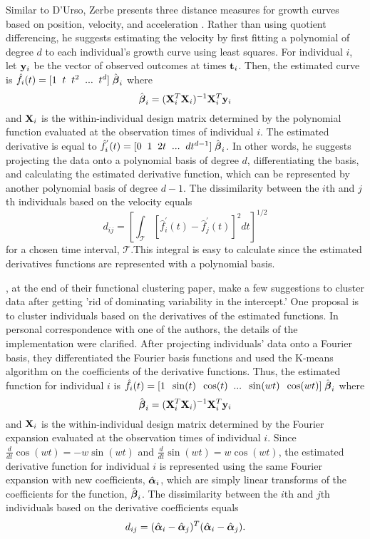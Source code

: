 Similar to D'Urso, Zerbe presents three distance measures for growth curves based on position, velocity, and acceleration \cite{zerbe1979,schneiderman1993}. Rather than using quotient differencing, he suggests estimating the velocity by first fitting a polynomial of degree $d$ to each individual's growth curve using least squares. For individual $i$, let $\mathbf y_{i}$ be the vector of observed outcomes at times $\mathbf t_{i}$. Then, the estimated curve is $\hat{f}_{i}(t) = [1\;\; t\;\;t^{2}\;\;...\;\;t^{d}]\;\hat{\boldsymbol\beta}_{i}$ where 
$$\hat{\boldsymbol\beta}_{i} = (\mathbf X^{T}_{i}\mathbf X_{i})^{-1}\mathbf X^{T}_{i}\mathbf y_{i}$$
and $\mathbf X_{i}$ is the within-individual design matrix determined by the polynomial function evaluated at the observation times of individual $i$. The estimated derivative is equal to
$\hat{f}_{i}^{'}(t) = [0\;\; 1\;\;2t\;\;...\;\;dt^{d-1}]\;\hat{\boldsymbol\beta}_{i}$. In other words, he suggests projecting the data onto a polynomial basis of degree $d$, differentiating the basis, and calculating the estimated derivative function, which can be represented by another polynomial basis of degree $d-1$. The dissimilarity between the $i$th and $j$th individuals based on the velocity equals
$$d_{ij} =\left[ \int_{\mathcal{T}} [\hat{f}^{'}_{i}(t)-\hat{f}^{'}_{j}(t)]^{2}dt\right]^{1/2}$$
for a chosen time interval, $\mathcal{T}$.This integral is easy to calculate since the estimated derivatives functions are represented with a polynomial basis.

\textcite{tarpey2003}, at the end of their functional clustering paper, make a few suggestions to cluster data after getting 'rid of dominating variability in the intercept.' One proposal is to cluster individuals based on the derivatives of the estimated functions. In personal correspondence with one of the authors, the details of the implementation were clarified. After projecting individuals' data onto a Fourier basis, they differentiated the Fourier basis functions and used the K-means algorithm on the coefficients of the derivative functions. Thus, the estimated function for individual $i$ is $\hat{f}_{i}(t)= [1\;\; \sin(t)\;\;\cos(t)\;\;...\;\;\sin(wt)\;\;\cos(wt)]\;\hat{\boldsymbol\beta}_{i}$ where
$$\hat{\boldsymbol\beta}_{i} = (\mathbf X^{T}_{i}\mathbf X_{i})^{-1}\mathbf X^{T}_{i}\mathbf y_{i}$$
and $\mathbf X_{i}$ is the within-individual design matrix determined by the Fourier expansion evaluated at the observation times of individual $i$. Since $\frac{d}{dt}\cos(wt) = -w\sin(wt)$ and $\frac{d}{dt}\sin(wt) = w\cos(wt)$, the estimated derivative function for individual $i$ is represented using the same Fourier expansion with new coefficients, $\hat{\boldsymbol\alpha}_{i}$, which are simply linear transforms of the coefficients for the function, $\hat{\boldsymbol\beta}_{i}$. The dissimilarity between the $i$th and $j$th individuals based on the derivative coefficients equals
$$d_{ij} = (\hat{\boldsymbol\alpha}_{i}-\hat{\boldsymbol\alpha}_{j})^{T}(\hat{\boldsymbol\alpha}_{i}-\hat{\boldsymbol\alpha}_{j}).$$

